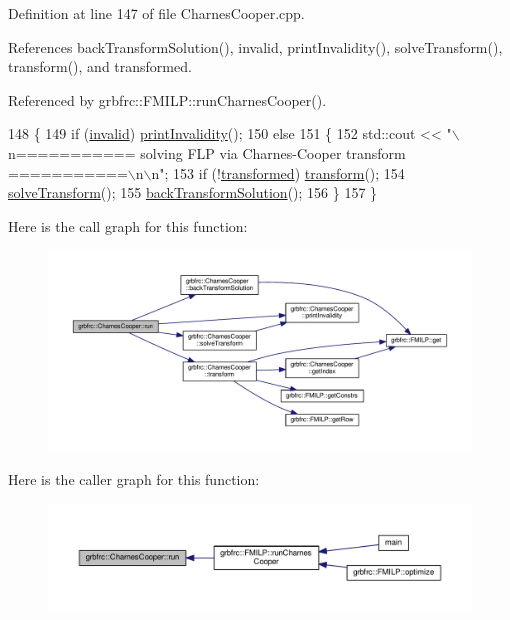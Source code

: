 Definition at line 147 of file Charnes\+Cooper.\+cpp.



References back\+Transform\+Solution(), invalid, print\+Invalidity(), solve\+Transform(), transform(), and transformed.



Referenced by grbfrc\+::\+F\+M\+I\+L\+P\+::run\+Charnes\+Cooper().


\begin{DoxyCode}
148  \{
149   \textcolor{keywordflow}{if} (\hyperlink{classgrbfrc_1_1CharnesCooper_a4aaa78ed310e18365a3ec113079b3cd2}{invalid}) \hyperlink{classgrbfrc_1_1CharnesCooper_a7fd7dab1c9c2b07684f632ec760ce254}{printInvalidity}();
150   \textcolor{keywordflow}{else}
151    \{
152     std::cout << \textcolor{stringliteral}{"\(\backslash\)n=========== solving FLP via Charnes-Cooper transform ===========\(\backslash\)n\(\backslash\)n"};
153     \textcolor{keywordflow}{if} (!\hyperlink{classgrbfrc_1_1CharnesCooper_a9a0d42480205cfd0f380e104ba83f24e}{transformed}) \hyperlink{classgrbfrc_1_1CharnesCooper_a39fc997916d1ea49eb71befd41b00122}{transform}();
154     \hyperlink{classgrbfrc_1_1CharnesCooper_a79b2646f00c0af4273b966986710626b}{solveTransform}();
155     \hyperlink{classgrbfrc_1_1CharnesCooper_a68d987a454bdb20c7ef9a3d51f4cc85a}{backTransformSolution}();
156    \}
157  \}
\end{DoxyCode}


Here is the call graph for this function\+:
\nopagebreak
\begin{figure}[H]
\begin{center}
\leavevmode
\includegraphics[width=350pt]{classgrbfrc_1_1CharnesCooper_a997fa3c5b32d054ae738b25963475385_cgraph}
\end{center}
\end{figure}




Here is the caller graph for this function\+:
\nopagebreak
\begin{figure}[H]
\begin{center}
\leavevmode
\includegraphics[width=350pt]{classgrbfrc_1_1CharnesCooper_a997fa3c5b32d054ae738b25963475385_icgraph}
\end{center}
\end{figure}


